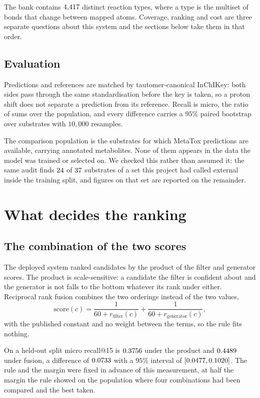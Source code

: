 \documentclass[11pt]{article}
\begin{document}
The bank contains $4{,}417$ distinct reaction types, where a type is the multiset of bonds
that change between mapped atoms. Coverage, ranking and cost are three separate questions about
this system and the sections below take them in that order.

\subsection{Evaluation}

Predictions and references are matched by tautomer-canonical InChIKey: both sides pass through the
same standardisation before the key is taken, so a proton shift does not separate a prediction from
its reference. Recall is micro, the ratio of sums over the population, and every difference carries
a $95\%$ paired bootstrap over substrates with $10{,}000$ resamples.

The comparison population is the \numPopulationN{} substrates for which MetaTox predictions are
available, carrying \numPopulationReferences{} annotated metabolites. None of them appears in the
data the model was trained or selected on. We checked this rather than assumed it: the same audit
finds $24$ of $37$ substrates of a set this project had called external
inside the training split, and figures on that set are reported on the remainder.

\section{What decides the ranking}

\subsection{The combination of the two scores}

The deployed system ranked candidates by the product of the filter and generator scores. The
product is scale-sensitive: a candidate the filter is confident about and the generator is not
falls to the bottom whatever its rank under either. Reciprocal rank fusion \citep{cormack2009}
combines the two orderings instead of the two values,
\[
\mathrm{score}(c) = \frac{1}{60 + r_{\mathrm{filter}}(c)} + \frac{1}{60 + r_{\mathrm{generator}}(c)},
\]
with the published constant and no weight between the terms, so the rule fits nothing.

On a held-out split micro recall@15 is $0.3756$ under the product and
$0.4489$ under fusion, a difference of $0.0733$ with a $95\%$ interval of
$[0.0477, 0.1020]$. The rule and the margin were fixed in advance of this measurement,
at half the margin the rule showed on the population where four combinations had been compared and
the best taken.
\end{document}
